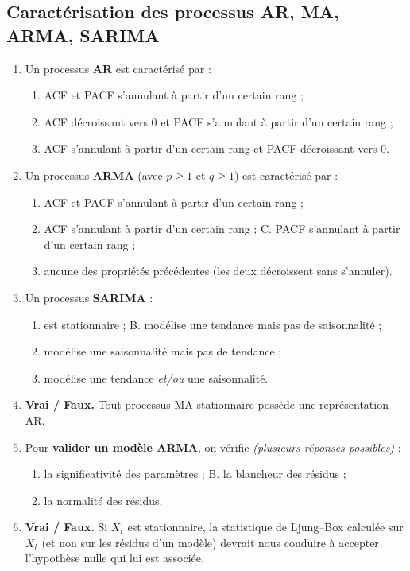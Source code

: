 \documentclass[11pt]{article}
\begin{document}
\subsection{Caractérisation des processus AR, MA, ARMA, SARIMA}
\begin{enumerate}[label=\textbf{Q\,A.\arabic*},leftmargin=*,start=9]
\item Un processus \textbf{AR} est caractérisé par :
\begin{enumerate}[label=\Alph*.,nosep]
  \item ACF et PACF s'annulant à partir d'un certain rang ;
  \item ACF décroissant vers 0 et PACF s'annulant à partir d'un certain rang ;
  \item ACF s'annulant à partir d'un certain rang et PACF décroissant vers 0.
\end{enumerate}
\item Un processus \textbf{ARMA} (avec $p\ge1$ et $q\ge1$) est caractérisé par :
\begin{enumerate}[label=\Alph*.,nosep]
  \item ACF et PACF s'annulant à partir d'un certain rang ;
  \item ACF s'annulant à partir d'un certain rang ; \quad C. PACF s'annulant à partir d'un certain rang ;
  \item aucune des propriétés précédentes (les deux décroissent sans s'annuler).
\end{enumerate}
\item Un processus \textbf{SARIMA} :
\begin{enumerate}[label=\Alph*.,nosep]
  \item est stationnaire ; \quad B. modélise une tendance mais pas de saisonnalité ;
  \item modélise une saisonnalité mais pas de tendance ;
  \item modélise une tendance \emph{et/ou} une saisonnalité.
\end{enumerate}
\item \textbf{Vrai / Faux.} Tout processus MA stationnaire possède une représentation AR.
\item Pour \textbf{valider un modèle ARMA}, on vérifie \emph{(plusieurs réponses possibles)} :
\begin{enumerate}[label=\Alph*.,nosep]
  \item la significativité des paramètres ; \quad B. la blancheur des résidus ;
  \item la normalité des résidus.
\end{enumerate}
\item \textbf{Vrai / Faux.} Si $X_t$ est stationnaire, la statistique de Ljung--Box calculée
sur $X_t$ (et non sur les résidus d'un modèle) devrait nous conduire à accepter l'hypothèse
nulle qui lui est associée.
\end{enumerate}
\end{document}
